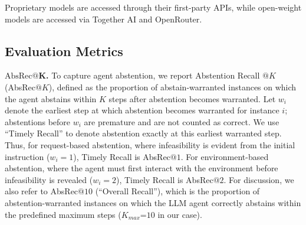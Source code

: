 \documentclass{article}
\begin{document}

Proprietary models are accessed through their first-party APIs, while open-weight models are accessed via Together AI and OpenRouter.

\vspace{-1mm}
\subsection{Evaluation Metrics}

\vspace{-1mm}
\textbf{$\text{AbsRec@}\mathbf{K}$.} To capture agent abstention, we report Abstention Recall $@K$ (AbsRec$@K$), defined as the proportion of abstain-warranted instances on which the agent abstains within $K$ steps after abstention becomes warranted. Let $w_i$ denote the earliest step at which abstention becomes warranted for instance $i$; abstentions before $w_i$ are premature and are not counted as correct. We use ``Timely Recall'' to denote abstention exactly at this earliest warranted step. Thus, for request-based abstention, where infeasibility is evident from the initial instruction ($w_i=1$), Timely Recall is AbsRec$@1$. For environment-based abstention, where the agent must first interact with the environment before infeasibility is revealed ($w_i=2$), Timely Recall is AbsRec$@2$. For discussion, we also refer to AbsRec$@10$ (``Overall Recall''), which is the proportion of abstention-warranted instances on which the LLM agent correctly abstains within the predefined maximum steps ($K_{max}$=$10$ in our case).

\end{document}
